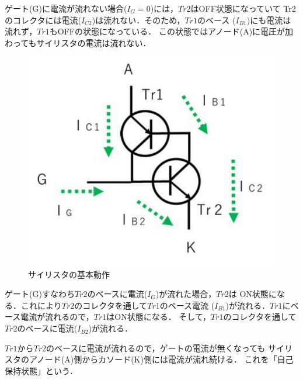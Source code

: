 \begin{enumerate}
\begin{description}
        ゲート(G)に電流が流れない場合($I_G=0$)には，$Tr2$はOFF状態になっていて
        Tr2のコレクタには電流($I_{C2}$)は流れない．そのため，$Tr1$のベース
        ($I_{B1}$)にも電流は流れず，$Tr1$もOFFの状態になっている．
        この状態ではアノード(A)に電圧が加わってもサイリスタの電流は流れない．
        \begin{figure}[H]
            \begin{center}
                \includegraphics[scale=0.5]{figure5.pdf}
                \caption{サイリスタの基本動作}
            \end{center}
        \end{figure}

        \newpage

        ゲート(G)すなわち$Tr2$のベースに電流($I_G$)が流れた場合，$Tr2$は
        ON状態になる．これにより$Tr2$のコレクタを通して$Tr1$のベース電流
        ($I_{B1}$)が流れる．$Tr1$にベース電流が流れるので，$Tr1$はON状態になる．
        そして，$Tr1$のコレクタを通して$Tr2$のベースに電流($I_{B2}$)が流れる．
        
        $Tr1$から$Tr2$のベースに電流が流れるので，ゲートの電流が無くなっても
        サイリスタのアノード(A)側からカソード(K)側には電流が流れ続ける．
        これを「自己保持状態」という．


\end{description}
\end{enumerate}
